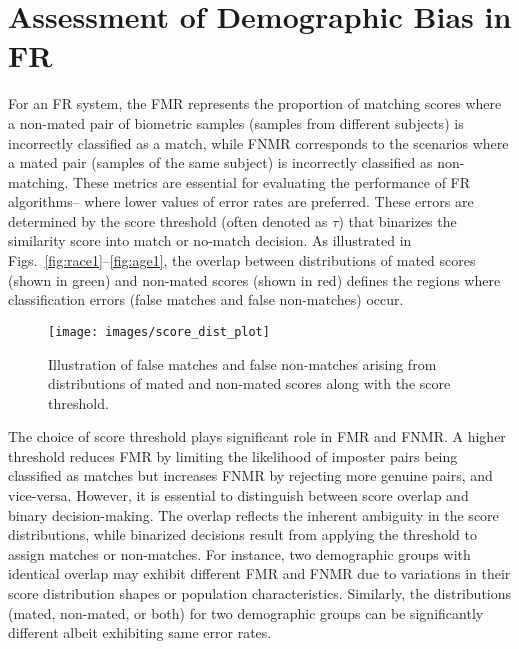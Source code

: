 \section{Assessment of Demographic Bias in FR}
\label{sec:assessment}

For an FR system, the FMR represents the proportion of matching scores where a
non-mated pair of biometric samples (\ie samples from different subjects) is
incorrectly classified as a match, while FNMR corresponds to the scenarios where
a mated pair (\ie samples of the same subject) is incorrectly classified as
non-matching. These metrics are essential for evaluating the performance of FR
algorithms-- where lower values of error rates are preferred.  These errors are
determined by the score threshold (often denoted as $\tau$) that binarizes the
similarity score into match or no-match decision. As illustrated in
Figs.~\ref{fig:race1}--\ref{fig:age1}, the overlap between distributions of
mated scores (shown in green) and non-mated scores (shown in red) defines the
regions where classification errors (\ie false matches and false non-matches)
occur.


\begin{figure}[!t]
\centering
\texttt{[image: images/score\_dist\_plot]}
\caption{Illustration of false matches and false non-matches arising from
distributions of mated and non-mated scores along with the score
threshold.}
\label{fig:score_dist_plot}
\end{figure}

The choice of score threshold plays significant role in FMR and FNMR. A higher
threshold reduces FMR by limiting the likelihood of imposter pairs being
classified as matches but increases FNMR by rejecting more genuine pairs, and
vice-versa.  However, it is essential to distinguish between score overlap and
binary decision-making. The overlap reflects the inherent ambiguity in the
score distributions, while binarized decisions result from applying the
threshold to assign matches or non-matches. For instance, two demographic
groups with identical overlap may exhibit different FMR and FNMR due to
variations in their score distribution shapes or population characteristics.
Similarly, the distributions (mated, non-mated, or both) for two demographic
groups can be significantly different albeit exhibiting same error rates.


